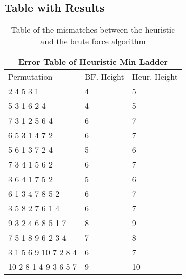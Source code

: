 \subsection{Table with Results}
\begin{table}[!htp]
  \centering
     \begin{tabular}{|p{6cm}|p{2cm}|p{2cm}|}
        \hline
         \multicolumn{3}{|c|}{Error Table of Heuristic Min Ladder}\\
         \hline
        \hline 
         Permutation & BF. Height & Heur. Height\\ 
         \hline 
         2  4  5  3  1 & 4 & 5 \\ 
         \hline 
         5  3  1  6  2  4 & 4 & 5 \\ 
         \hline 
         7  3  1  2  5  6  4  & 6 & 7 \\ 
         \hline 
         6  5  3  1  4  7  2  & 6 & 7\\ 
         \hline 
         5  6  1  3  7  2  4  & 5 & 6 \\ 
         \hline 
         7  3  4  1  5  6  2  & 6 & 7 \\ 
         \hline 
         3  6  4  1  7  5  2 & 5 & 6 \\ 
         \hline 
          6  1  3  4  7  8  5  2 & 6 & 7\\ 
          \hline 
          3  5  8  2  7  6  1  4 & 6 & 7 \\ 
          \hline 
          9  3  2  4  6  8  5  1  7 & 8 & 9\\ 
          \hline 
           7  5  1  8  9  6  2  3  4 & 7 & 8 \\ 
           \hline 
            3  1  5  6  9  10  7  2  8  4 & 6 & 7 \\ 
            \hline 
          10  2  8  1  4  9  3  6  5  7 & 9 & 10 \\ 
         \hline
     \end{tabular}
     
      
     \caption{Table of the mismatches between the heuristic and the brute force algorithm}
     \label{Table:MinHeightFailures}
 \end{table}

 